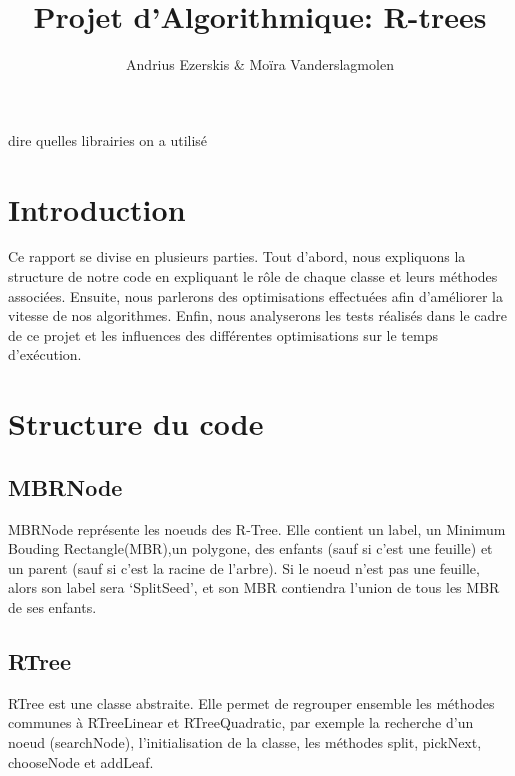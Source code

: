 \documentclass[utf8]{article}
\begin{document}
\begin{titlepage}


  \author{Andrius Ezerskis \& Moïra Vanderslagmolen}
  \title{Projet d'Algorithmique: R-trees}
  \maketitle
\end{titlepage}
\tableofcontents
\newpage
\begin{large}



  dire quelles librairies on a utilisé


  \section{Introduction}
  \indent
  \par
  Ce rapport se divise en plusieurs parties. Tout d'abord, nous expliquons la
  structure de notre code en expliquant le rôle de chaque classe et leurs
  méthodes associées. Ensuite, nous parlerons des optimisations effectuées afin
  d'améliorer la vitesse de nos algorithmes. Enfin, nous analyserons les tests
  réalisés dans le cadre de ce projet et les influences des différentes
  optimisations sur le temps d'exécution.
  \par
  \section{Structure du code}

  \par
  \subsection{MBRNode}
  \indent
  \par
  MBRNode représente les noeuds des R-Tree. Elle contient un label, un Minimum Bouding Rectangle(MBR),un polygone,
  des enfants (sauf si c'est une feuille) et un parent (sauf si c'est la racine de
  l'arbre). Si le noeud n'est pas une feuille, alors son label sera `SplitSeed',
  et son MBR contiendra l'union de tous les MBR de ses enfants.
  \par

  \subsection{RTree}\label{RTree}
  \indent
  \par
  RTree est une classe abstraite. Elle permet de regrouper ensemble les méthodes
  communes à RTreeLinear et RTreeQuadratic, par exemple la recherche d'un noeud
  (searchNode), l'initialisation de la classe, les méthodes split, pickNext,
  chooseNode et addLeaf.
  \par


\end{large}
\end{document}
